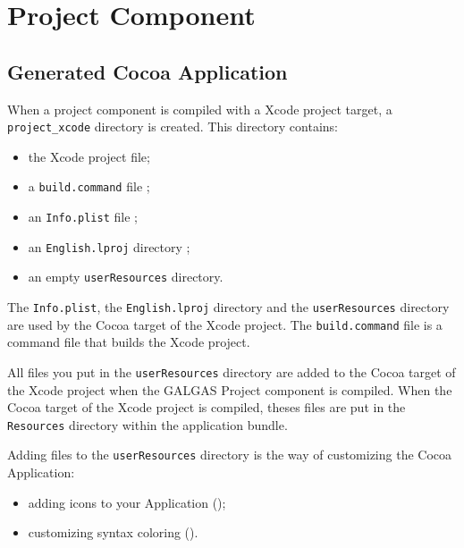 
\chapter{Project Component}


\section{Generated Cocoa Application}

When a project component is compiled with a Xcode project target, a \texttt{project\_xcode} directory is created. This directory contains:
\begin{itemize}
\item the Xcode project file;
\item a \texttt{build.command} file ;
\item an \texttt{Info.plist} file ;
\item an \texttt{English.lproj} directory ;
\item an empty \texttt{userResources} directory.
\end{itemize}

The \texttt{Info.plist}, the \texttt{English.lproj} directory and the \texttt{userResources} directory are used by the Cocoa target of the Xcode project. The \texttt{build.command} file is a command file that builds the Xcode project.

All files you put in the \texttt{userResources} directory are added to the Cocoa target of the Xcode project when the GALGAS Project component is compiled. When the Cocoa target of the Xcode project is compiled, theses files are put in the \texttt{Resources} directory within the application bundle.

Adding files to the \texttt{userResources} directory is the way of customizing the Cocoa Application:
\begin{itemize}
\item adding icons to your Application ();
\item customizing syntax coloring (). 
\end{itemize}





